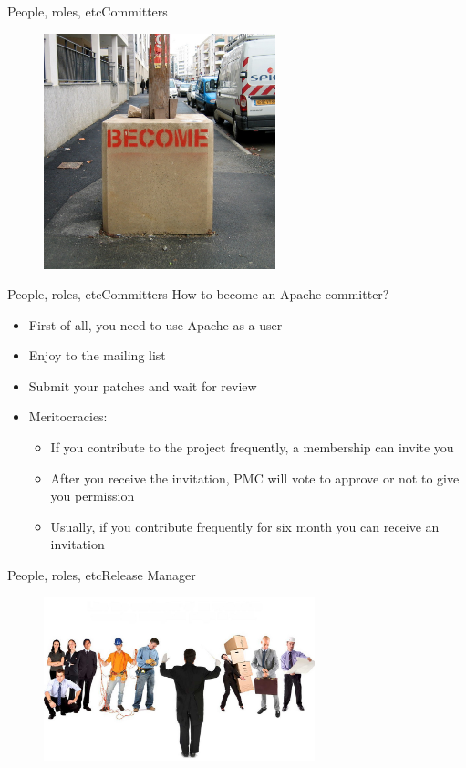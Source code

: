 \documentclass[10pt]{beamer}
\begin{document}
\begin{frame}{People, roles, etc}{Committers}
  \begin{figure}[ht]
    \centering
    \includegraphics[width=0.6\textwidth, keepaspectratio=true]{images/become.jpg}
  \end{figure}
\end{frame}

\begin{frame}{People, roles, etc}{Committers}
  How to become an Apache committer? \pause
  \begin{itemize}
    \item First of all, you need to use Apache as a user \pause
    \item Enjoy to the mailing list \pause
    \item Submit your patches and wait for review \pause
    \item Meritocracies:
    \begin{itemize}
      \item If you contribute to the project frequently, a membership can
            invite you \pause
      \item After you receive the invitation, PMC will vote to approve or not
            to give you permission \pause
      \item Usually, if you contribute frequently for six month you can receive
            an invitation
    \end{itemize}
  \end{itemize}
\end{frame}

\begin{frame}{People, roles, etc}{Release Manager}
  \begin{figure}[ht]
    \centering
    \includegraphics[width=0.7\textwidth, keepaspectratio=true]{images/release_management.jpg}
  \end{figure}
\end{frame}
\end{document}
